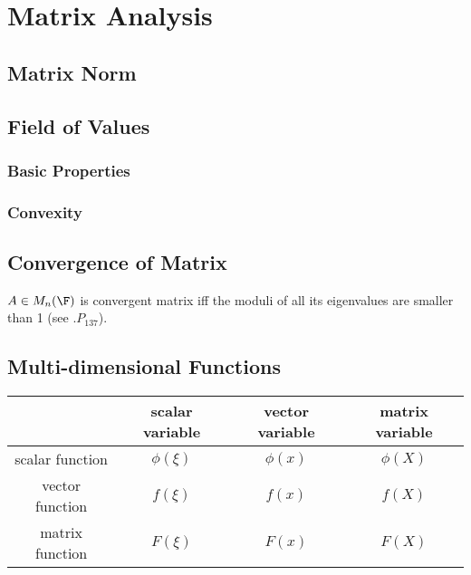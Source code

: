 \chapter{Matrix Analysis}

\section{Matrix Norm}


\section{Field of Values}

\subsection{Basic Properties}

\subsection{Convexity}




\section{Convergence of Matrix}

$A\in M_n(\F)$ is convergent matrix iff the moduli of all its eigenvalues are smaller than 1 (see \cite{Horn_Johnson_1990}.$P_{137}$).






\section{Multi-dimensional Functions}

\begin{center}
\begin{tabular}{cccc}
\hline
& scalar variable & vector variable & matrix variable \\
\hline
scalar function & $\phi(\xi)$ & $\phi(x)$ & $\phi(X)$  \\
vector function & $f(\xi)$ & $f(x)$ & $f(X)$  \\
matrix function & $F(\xi)$ & $F(x)$ & $F(X)$  \\
\hline
\end{tabular}
\end{center}


